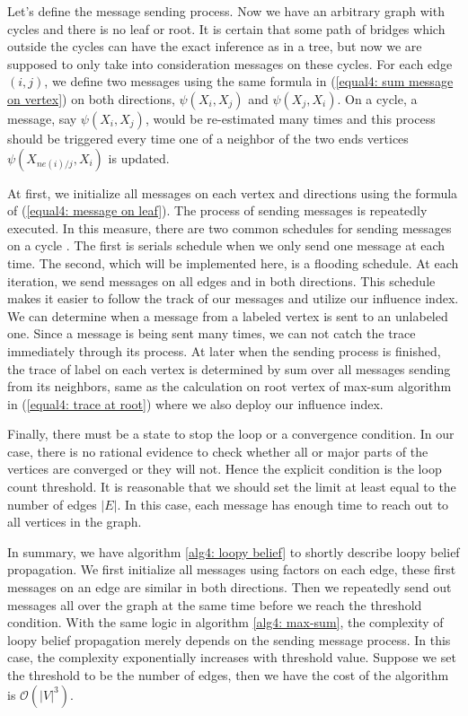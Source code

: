 Let's define the message sending process. Now we have an arbitrary graph with cycles and there is no leaf or root. It is certain that some path of bridges which outside the cycles can have the exact inference as in a tree, but now we are supposed to only take into consideration messages on these cycles. For each edge $(i,j)$, we define two messages using the same formula in (\ref{equal4: sum message on vertex}) on both directions, $\psi(X_i, X_j)$ and $\psi(X_j, X_i)$. On a cycle, a message, say $\psi(X_i, X_j)$, would be re-estimated many times and this process should be triggered every time one of a neighbor of the two ends vertices $\psi(X_{ne(i)/j}, X_i)$ is updated.

At first, we initialize all messages on each vertex and directions using the formula of (\ref{equal4: message on leaf}). The process of sending messages is repeatedly executed. In this measure, there are two common schedules for sending messages on a cycle \parencite{bishop2006pattern}. The first is serials schedule when we only send one message at each time. The second, which will be implemented here, is a flooding schedule. At each iteration, we send messages on all edges and in both directions. This schedule makes it easier to follow the track of our messages and utilize our influence index. We can determine when a message from a labeled vertex is sent to an unlabeled one. Since a message is being sent many times, we can not catch the trace immediately through its process. At later when the sending process is finished, the trace of label on each vertex is determined by sum over all messages sending from its neighbors, same as the calculation on root vertex of max-sum algorithm in (\ref{equal4: trace at root}) where we also deploy our influence index.

Finally, there must be a state to stop the loop or a convergence condition. In our case, there is no rational evidence to check whether all or major parts of the vertices are converged or they will not. Hence the explicit condition is the loop count threshold. It is reasonable that we should set the limit at least equal to the number of edges $|E|$. In this case, each message has enough time to reach out to all vertices in the graph. 

In summary, we have algorithm \ref{alg4: loopy belief} to shortly describe loopy belief propagation. We first initialize all messages using factors on each edge, these first messages on an edge are similar in both directions. Then we repeatedly send out messages all over the graph at the same time before we reach the threshold condition. With the same logic in algorithm \ref{alg4: max-sum}, the complexity of loopy belief propagation merely depends on the sending message process. In this case, the complexity exponentially increases with threshold value. Suppose we set the threshold to be the number of edges, then we have the cost of the algorithm is $\mathcal{O}(|V|^3)$. 

